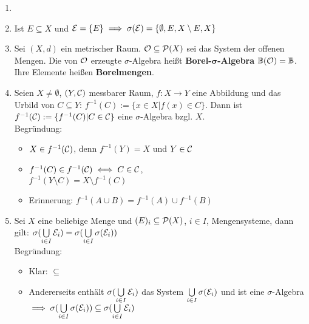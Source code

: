   \begin{example}
    \begin{enumerate}
      \item[]
      \item Ist $E \subseteq X$ und $\mathcal{E} = \{E\} \implies \sigma(\mathcal{E}) = \{\emptyset, E, X \setminus E, X\}$
      \item Sei $(X,d)$ ein metrischer Raum. $\mathcal{O} \subseteq \mathcal{P}(X)$ sei das System der offenen Mengen. Die von $\mathcal{O}$ erzeugte $\sigma$-Algebra heißt \textbf{Borel-$\bm{\sigma}$-Algebra} $\mathbb{B} (\mathcal{O})=\mathbb{B}$. Ihre Elemente heißen \textbf{Borelmengen}.
      \item Seien $X \neq \emptyset$, $(Y, \mathcal{C})$ messbarer Raum, $f:X \to Y$ eine Abbildung und das Urbild von $C \subseteq Y$: $f^{-1}(C) := \{x \in X|f(x) \in C\}$. Dann ist $f^{-1}(\mathcal{C}):=\{f^{-1}(C)|C \in \mathcal{C}\}$ eine $\sigma$-Algebra bzgl. $X$.\\
            Begründung: 
            \begin{itemize}
              \item $X \in f^{-1}(\mathcal{C})$, denn $f^{-1}(Y) = X$ und $Y \in \mathcal{C}$
              \item $f^{-1}(C) \in f^{-1}(\mathcal{C}) \iff C \in \mathcal{C}$,\\$f^{-1}(Y \setminus C) = X \setminus f^{-1}(C)$
              \item Erinnerung: $f^{-1}(A \cup B) = f^{-1}(A) \cup f^{-1}(B)$
            \end{itemize}
      \item Sei $X$ eine beliebige Menge und $\mathcal{(}E)_i \subseteq \mathcal{P}(X)$, $i \in I$, Mengensysteme, dann gilt: $\sigma(\bigcup\limits_{i \in I} \mathcal{E}_i) = \sigma(\bigcup\limits_{i \in I} \sigma(\mathcal{E}_i))$\\
            Begründung:
            \begin{itemize}
              \item Klar: $\subseteq$
              \item Andererseits enthält $\sigma(\bigcup\limits_{i \in I} \mathcal{E}_i)$ das System $\bigcup\limits_{i \in I} \sigma (\mathcal{E}_i)$ und ist eine $\sigma$-Algebra $\implies \sigma(\bigcup\limits_{i \in I} \sigma(\mathcal{E}_i)) \subseteq \sigma(\bigcup\limits_{i \in I} \mathcal{E}_i)$
            \end{itemize}
    \end{enumerate}
  \end{example}

